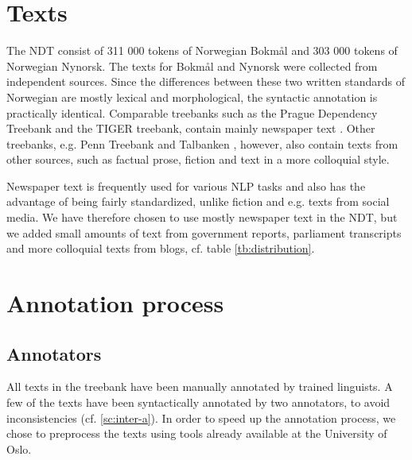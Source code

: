\documentclass[11pt,a4paper]{article}
\begin{document}
\section{Texts}
The NDT consist of 311 000 tokens of Norwegian Bokmål and 303 000 tokens of Norwegian Nynorsk. The texts for Bokmål and Nynorsk were collected from independent sources. Since the differences between these two written standards of Norwegian are mostly lexical and morphological, the syntactic annotation is practically identical. Comparable treebanks such as the Prague Dependency Treebank and the TIGER treebank, contain mainly newspaper text \cite{Boh:Haj:Hla:2003,Bra:2004}. Other treebanks, e.g. Penn Treebank and Talbanken \cite{Mar:San:Mar:93,Niv:Nil:Hal:2006}, however, also contain texts from other sources, such as factual prose, fiction and text in a more colloquial style.

Newspaper text is frequently used for various NLP tasks and also has the advantage of being fairly standardized, unlike fiction and e.g. texts from social media. We have therefore chosen to use mostly newspaper text in the NDT, but we added small amounts of text from government reports, parliament transcripts and more colloquial texts from blogs, cf. table \ref{tb:distribution}.



\section{Annotation process}
\subsection{Annotators}
All texts in the treebank have been manually annotated by trained linguists. A
few of the texts have been syntactically annotated by two annotators, to
avoid inconsistencies (cf. \ref{sc:inter-a}). In order to speed up the annotation
process, we chose to preprocess the texts using tools already available at the
University of Oslo.
\end{document}
